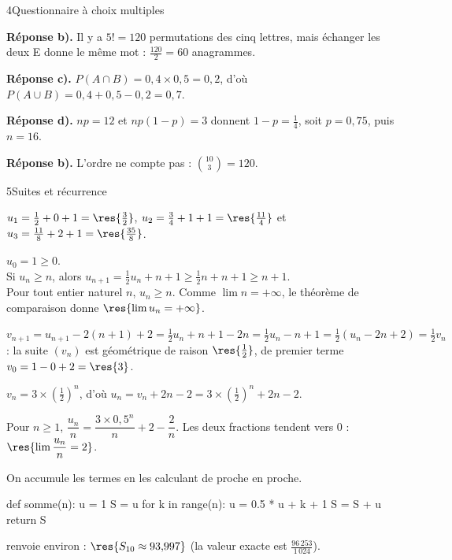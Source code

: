 

\begin{corrigeBac}{4}{Questionnaire à choix multiples}
\begin{questions}
  \item \textbf{Réponse b).} Il y a $5!=120$ permutations des cinq lettres, mais échanger les deux E donne le même mot :
    $\frac{120}{2}=60$ anagrammes. \pts{1 pt}
  \item \textbf{Réponse c).} $P(A\cap B)=0{,}4\times0{,}5=0{,}2$, d'où $P(A\cup B)=0{,}4+0{,}5-0{,}2=0{,}7$. \pts{1 pt}
  \item \textbf{Réponse d).} $np=12$ et $np(1-p)=3$ donnent $1-p=\frac14$, soit $p=0{,}75$, puis $n=16$. \pts{1 pt}
  \item \textbf{Réponse b).} L'ordre ne compte pas : $\binom{10}{3}=120$. \pts{1 pt}
\end{questions}
\end{corrigeBac}

\begin{corrigeBac}{5}{Suites et récurrence}
\begin{questions}
  \item $u_1=\frac12+0+1=\res{\tfrac32}$, $u_2=\frac34+1+1=\res{\tfrac{11}4}$ et $u_3=\frac{11}8+2+1=\res{\tfrac{35}{8}}$. 
  \item {} $u_0=1\geq0$.\\
     Si $u_n\geq n$, alors $u_{n+1}=\frac12u_n+n+1\geq\frac12n+n+1\geq n+1$.\\
     Pour tout entier naturel $n$, $u_n\geq n$. Comme $\lim n=+\infty$, le théorème de comparaison donne
    $\res{\lim u_n=+\infty}$. 
  \item $v_{n+1}=u_{n+1}-2(n+1)+2=\frac12u_n+n+1-2n=\frac12u_n-n+1=\frac12\left(u_n-2n+2\right)=\frac12v_n$ : la suite $(v_n)$ est
    géométrique de raison $\res{\tfrac12}$, de premier terme $v_0=1-0+2=\res{3}$. 
  \item $v_n=3\times\left(\frac12\right)^{n}$, d'où $u_n=v_n+2n-2=3\times\left(\frac12\right)^{n}+2n-2$. 
  \item Pour $n\geq1$, $\dfrac{u_n}{n}=\dfrac{3\times0{,}5^{n}}{n}+2-\dfrac2n$. Les deux fractions tendent vers $0$ :
    $\res{\lim\dfrac{u_n}{n}=2}$. 
  \item On accumule les termes en les calculant de proche en proche.
\begin{codecote}[0.45]
\begin{pythoncol}
def somme(n):
    u = 1
    S = u
    for k in range(n):
        u = 0.5 * u + k + 1
        S = S + u
    return S
\end{pythoncol}
\cote
{} renvoie environ  : $\res{S_{10}\approx93{,}997}$ (la valeur exacte est $\frac{96\,253}{1\,024}$).
\end{codecote}
\end{questions}
\end{corrigeBac}

